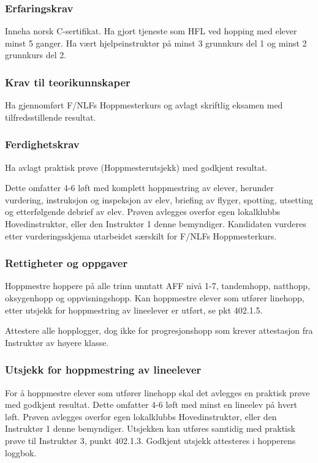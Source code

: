 \subsubsection{Erfaringskrav}
Inneha norsk C-sertifikat. Ha gjort tjeneste som HFL ved hopping med elever minst 5 ganger. Ha vært hjelpeinstruktør på minst 3 grunnkurs del 1 og minst 2 grunnkurs del 2.

\subsubsection{Krav til teorikunnskaper}
Ha gjennomført F/NLFs Hoppmesterkurs og avlagt skriftlig eksamen med tilfredsstillende resultat.

\subsubsection{Ferdighetskrav}
Ha avlagt praktisk prøve (Hoppmesterutsjekk) med godkjent resultat.

Dette omfatter 4-6 løft med komplett hoppmestring av elever, herunder vurdering, instruksjon og inspeksjon av elev, briefing av flyger, spotting, utsetting og etterfølgende debrief av elev. Prøven avlegges overfor egen lokalklubbs Hovedinstruktør, eller den Instruktør 1 denne bemyndiger. Kandidaten vurderes etter vurderingsskjema utarbeidet særskilt for F/NLFs Hoppmesterkurs.

\subsubsection{Rettigheter og oppgaver}
Hoppmestre hoppere på alle trinn unntatt AFF nivå 1-7, tandemhopp, natthopp, oksygenhopp og oppvisningshopp. Kan hoppmestre elever som utfører linehopp, etter utsjekk for hoppmestring av lineelever er utført, se pkt 402.1.5.

Attestere alle hopplogger, dog ikke for progresjonshopp som krever attestasjon fra Instruktør av høyere klasse.

\subsubsection{Utsjekk for hoppmestring av lineelever}
For å hoppmestre elever som utfører linehopp skal det avlegges en praktisk prøve med godkjent resultat. Dette omfatter 4-6 løft med minst en lineelev på hvert løft. Prøven avlegges overfor egen lokalklubbs Hovedinstruktør, eller den Instruktør 1 denne bemyndiger. Utsjekken kan utføres samtidig med praktisk prøve til Instruktør 3, punkt 402.1.3. Godkjent utsjekk attesteres i hopperens loggbok.


